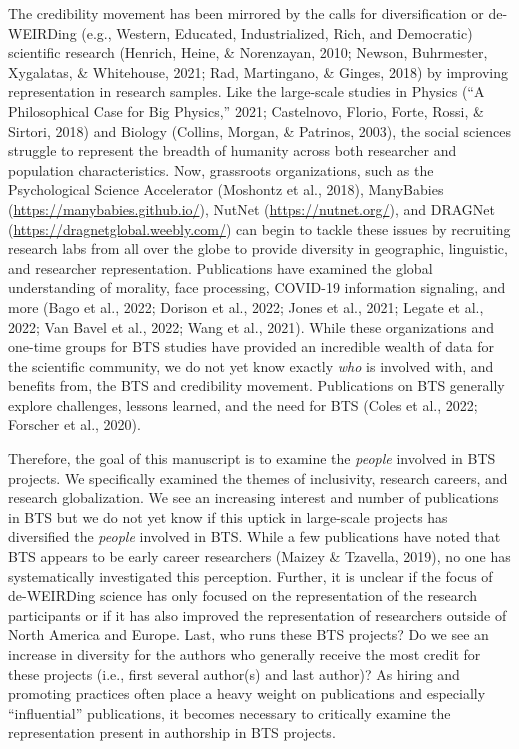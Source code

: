 \documentclass[
  man,floatsintext]{apa6}
\begin{document}
The credibility movement has been mirrored by the calls for
diversification or de-WEIRDing (e.g., Western, Educated, Industrialized,
Rich, and Democratic) scientific research (Henrich, Heine, \& Norenzayan, 2010; Newson, Buhrmester, Xygalatas, \& Whitehouse, 2021; Rad, Martingano, \& Ginges, 2018) by improving representation in research samples. Like the
large-scale studies in Physics ({``A Philosophical Case for Big Physics,''} 2021; Castelnovo, Florio, Forte, Rossi, \& Sirtori, 2018) and
Biology (Collins, Morgan, \& Patrinos, 2003), the social sciences struggle to represent the
breadth of humanity across both researcher and population
characteristics. Now, grassroots organizations, such as the
Psychological Science Accelerator (Moshontz et al., 2018), ManyBabies
(\url{https://manybabies.github.io/}), NutNet (\url{https://nutnet.org/}), and
DRAGNet (\url{https://dragnetglobal.weebly.com/}) can begin to tackle these
issues by recruiting research labs from all over the globe to provide
diversity in geographic, linguistic, and researcher representation.
Publications have examined the global understanding of morality, face
processing, COVID-19 information signaling, and more (Bago et al., 2022; Dorison et al., 2022; Jones et al., 2021; Legate et al., 2022; Van Bavel et al., 2022; Wang et al., 2021). While
these organizations and one-time groups for BTS studies have provided an
incredible wealth of data for the scientific community, we do not yet
know exactly \emph{who} is involved with, and benefits from, the BTS and
credibility movement. Publications on BTS generally explore challenges,
lessons learned, and the need for BTS (Coles et al., 2022; Forscher et al., 2020).

Therefore, the goal of this manuscript is to examine the \emph{people}
involved in BTS projects. We specifically examined the themes of inclusivity, research careers, and research globalization. We see an
increasing interest and number of publications in BTS but we do not yet know if
this uptick in large-scale projects has diversified the \emph{people}
involved in BTS. While a few publications have noted that BTS appears to
be early career researchers (Maizey \& Tzavella, 2019), no one has systematically
investigated this perception. Further, it is unclear if the focus of
de-WEIRDing science has only focused on the representation of the
research participants or if it has also improved the representation of
researchers outside of North America and Europe. Last, who runs these
BTS projects? Do we see an increase in diversity for the authors who
generally receive the most credit for these projects (i.e., first
several author(s) and last author)? As hiring and promoting practices
often place a heavy weight on publications and especially ``influential''
publications, it becomes necessary to critically examine the
representation present in authorship in BTS projects.
\end{document}
